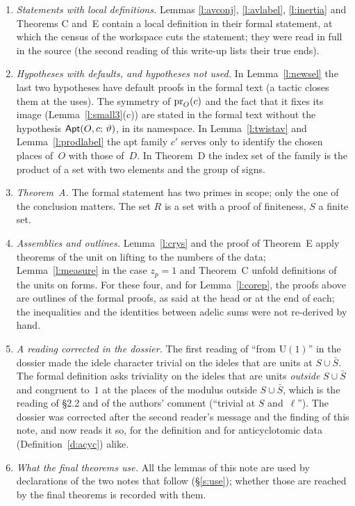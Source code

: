 \documentclass[11pt,a4paper]{article}
\newcommand{\m}[1]{\mbox{$#1$}}        %
\theoremstyle{plainx}
\theoremstyle{uprightx}
\newcommand{\cj}[1]{\bar{#1}}
\newcommand{\fo}{\mathfrak{o}}
\begin{document}
\begin{enumerate}[label=\textup{\arabic*.},leftmargin=1.6em,itemsep=5pt]
arguments, and is therefore written out; in Theorem~E the quantifier ``for all large~$\fo$'' is read as two
arguments. Instance arguments of definitions that the definition may not use are not listed.
\item \emph{Statements with local definitions.} Lemmas \ref{l:avconj}, \ref{l:avlabel}, \ref{l:inertia} and Theorems C
and~E contain a local definition in their formal statement, at which the census of the workspace cuts the
statement; they were read in full in the source (the second reading of this write-up lists their true ends).
\item \emph{Hypotheses with defaults, and hypotheses not used.} In Lemma~\ref{l:newsel} the last two hypotheses
have default proofs in the formal text (a tactic closes them at the uses). The symmetry of
\m{\tupleProj{O}{c}} and the fact that it fixes its image (Lemma~\ref{l:small3}(c)) are stated in the formal text
without the hypothesis \m{\IsApt{O}{c}{\vartheta}}, in its namespace. In Lemma~\ref{l:twistav} and
Lemma~\ref{l:prodlabel} the apt family $c'$ serves only to identify the chosen places of~$O$ with those of~$D$.
In Theorem~D the index set of the family is the product of a set with two elements and the group of signs.
\item \emph{Theorem~A.} The formal statement has two primes in scope; only the one of the conclusion matters.
The set $R$ is a set with a proof of finiteness, $S$ a finite set.
\item \emph{Assemblies and outlines.} Lemma~\ref{l:crys} and the proof of Theorem~E apply theorems of the unit
on lifting to the numbers of the data; Lemma~\ref{l:measure} in the case \m{z_p=1} and Theorem~C unfold
definitions of the units on forms. For these four, and for Lemma~\ref{l:corep}, the proofs above are outlines
of the formal proofs, as said at the head or at the end of each; the inequalities and the identities between adelic sums were not re-derived by hand.
\item \emph{A reading corrected in the dossier.} The first reading of ``from $\mathrm{U}(1)$'' in the dossier made
the idele character trivial on the ideles that are units at \m{S\cup\cj{S}}. The formal definition asks triviality
on the ideles that are units \emph{outside} \m{S\cup\cj{S}} and congruent to~$1$ at the places of the modulus
outside \m{S\cup\cj{S}}, which is the reading of §2.2 and of the authors' comment (``trivial at $S$ and~$\ell$'').
The dossier was corrected after the second reader's message and the finding of this note, and now reads it so,
for the definition and for anticyclotomic data (Definition~\ref{d:acyc}) alike.
\item \emph{What the final theorems use.} All the lemmas of this note are used by declarations of the two notes
that follow (§\ref{s:use}); whether those are reached by the final theorems is recorded with them.
\end{enumerate}
\end{document}

